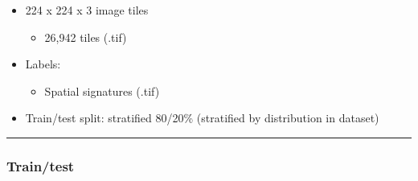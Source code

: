 \documentclass[
  letterpaper,
  DIV=11,
  numbers=noendperiod]{scrartcl}
\providecommand{\tightlist}{%
  \setlength{\itemsep}{0pt}\setlength{\parskip}{0pt}}\usepackage{longtable,booktabs,array}
\begin{document}
\begin{itemize}
\tightlist
\item
  224 x 224 x 3 image tiles

  \begin{itemize}
  \tightlist
  \item
    26,942 tiles (.tif)
  \end{itemize}
\item
  Labels:

  \begin{itemize}
  \tightlist
  \item
    Spatial signatures (.tif)
  \end{itemize}
\item
  Train/test split: stratified 80/20\% (stratified by distribution in
  dataset)
\end{itemize}

\begin{center}\rule{0.5\linewidth}{0.5pt}\end{center}

\subsubsection{Train/test}\label{traintest}
\end{document}
